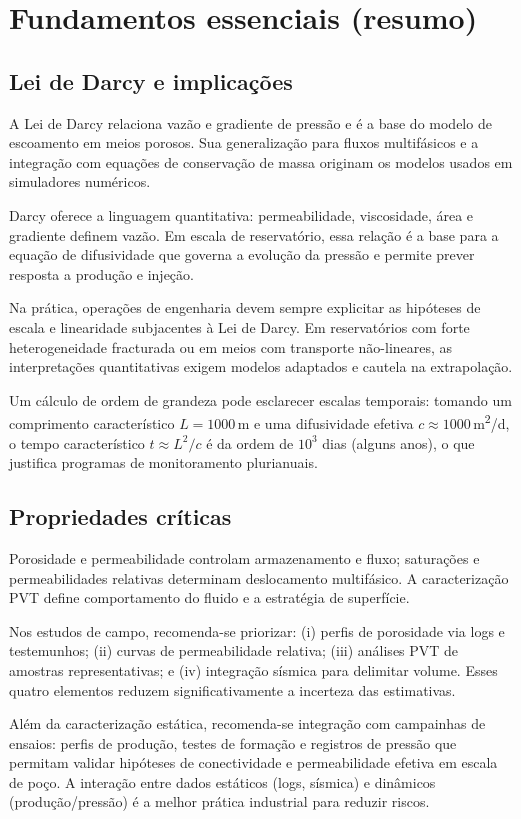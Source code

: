\documentclass[
  12pt,
  a4paper,
  oneside,
  brazilian,
  sumario=tradicional
]{abntex2}
\begin{document}
\chapter{Fundamentos essenciais (resumo)}
\section{Lei de Darcy e implicações}
A Lei de Darcy relaciona vazão e gradiente de pressão e é a base do modelo de
escoamento em meios porosos. Sua generalização para fluxos multifásicos e a
integração com equações de conservação de massa originam os modelos usados em
simuladores numéricos.

Darcy oferece a linguagem quantitativa: permeabilidade, viscosidade, área e
gradiente definem vazão. Em escala de reservatório, essa relação é a base
para a equação de difusividade que governa a evolução da pressão e permite
prever resposta a produção e injeção.

Na prática, operações de engenharia devem sempre explicitar as hipóteses de
escala e linearidade subjacentes à Lei de Darcy. Em reservatórios com forte
heterogeneidade fracturada ou em meios com transporte não-lineares, as
interpretações quantitativas exigem modelos adaptados e cautela na extrapolação.

Um cálculo de ordem de grandeza pode esclarecer escalas temporais: tomando um
comprimento característico $L=1000\,$m e uma difusividade efetiva $c\approx1000\,$m\textsuperscript{2}/d, o tempo característico $t\approx L^{2}/c$ é da ordem de $10^{3}$ dias (alguns anos), o que justifica programas de monitoramento plurianuais.

\section{Propriedades críticas}
Porosidade e permeabilidade controlam armazenamento e fluxo; saturações e
permeabilidades relativas determinam deslocamento multifásico. A caracterização
PVT define comportamento do fluido e a estratégia de superfície.

Nos estudos de campo, recomenda-se priorizar: (i) perfis de porosidade via
logs e testemunhos; (ii) curvas de permeabilidade relativa; (iii) análises PVT
de amostras representativas; e (iv) integração sísmica para delimitar volume.
Esses quatro elementos reduzem significativamente a incerteza das estimativas.

Além da caracterização estática, recomenda-se integração com campainhas de
ensaios: perfis de produção, testes de formação e registros de pressão que
permitam validar hipóteses de conectividade e permeabilidade efetiva em escala
de poço. A interação entre dados estáticos (logs, sísmica) e dinâmicos
(produção/pressão) é a melhor prática industrial para reduzir riscos.
\end{document}
